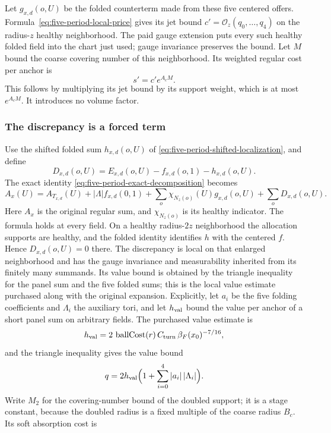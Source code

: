 Let $g_{x,d}(o,U)$ be the folded counterterm made from these five
centered offers. Formula~\eqref{eq:five-period-local-price} gives its
jet bound $c'=\mathcal O_z(q_0,\ldots,q_4)$ on the radius-$z$
healthy neighborhood. The paid gauge extension puts every such
healthy folded field into the chart just used; gauge invariance
preserves the bound. Let $M$ bound the coarse covering number of
this neighborhood. Its weighted regular cost per anchor is
\[
                              s'=c'e^{A_cM}.
\]
This follows by multiplying its jet bound by its support weight,
which is at most $e^{A_cM}$. It introduces no volume factor.

\subsubsection{The discrepancy is a forced term}
Use the shifted folded sum $h_{x,d}(o,U)$ of
\eqref{eq:five-period-shifted-localization}, and define
\[
 D_{x,d}(o,U)=E_{x,d}(o,U)-f_{x,d}(o,1)-h_{x,d}(o,U).
\]
The exact identity \eqref{eq:five-period-exact-decomposition} becomes
\begin{equation}\label{eq:selected-offer-exact-split}
 A_x(U)=A_{T_{x,d}}(U)+|\Lambda|f_{x,d}(0,1)
       +\sum_o\chi_{N_z(o)}(U)g_{x,d}(o,U)
       +\sum_oD_{x,d}(o,U).
\end{equation}
Here $A_x$ is the original regular sum, and $\chi_{N_z(o)}$ is its
healthy indicator. The formula holds at every field. On a healthy
radius-$2z$ neighborhood the allocation supports are healthy, and
the folded identity identifies $h$ with the centered $f$. Hence
$D_{x,d}(o,U)=0$ there. The discrepancy is local on that enlarged
neighborhood and has the gauge invariance and measurability inherited
from its finitely many summands. Its value bound is obtained by the
triangle inequality for the panel sum and the five folded sums; this
is the local value estimate purchased along with the original
expansion. Explicitly, let $a_i$ be the five folding coefficients
and $\Lambda_i$ the auxiliary tori, and let $h_{\rm val}$ bound the
value per anchor of a short panel sum on arbitrary fields. The
purchased value estimate is
\[
 h_{\rm val}=2\,\operatorname{ballCost}(r)\,C_{\rm turn}\,
                               \beta_F(x_0)^{-7/16},
\]
and the triangle inequality gives the value bound
\[
 q=2h_{\rm val}\Bigl(1+\sum_{i=0}^4|a_i|\,|\Lambda_i|\Bigr).
\]
Write $M_2$ for the covering-number
bound of the doubled support; it is a stage constant, because the
doubled radius is a fixed multiple of the coarse radius $B_c$. Its
soft absorption cost is
